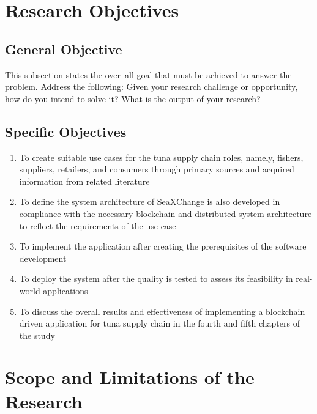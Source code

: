 \section{Research Objectives}
\label{sec:researchobjectives}

\subsection{General Objective}
\label{sec:generalobjective}

This subsection states the over--all goal that must be achieved to answer the problem.
Address the following: Given your research challenge or opportunity, how do you intend  to solve it? What is the output of your research?


\subsection{Specific Objectives}
\label{sec:specificobjectives}

%
%


\begin{enumerate}
	
	\item To create suitable use cases for the tuna supply chain roles, namely, fishers, suppliers, retailers, and consumers through primary sources and acquired information from related literature
	\item To define the system architecture of SeaXChange is also developed in compliance with the necessary blockchain and distributed system architecture to reflect the requirements of the use case
	\item To implement the application after creating the prerequisites of the software development  
	\item To deploy the system after the quality is tested to assess its feasibility in real-world applications 
	\item To discuss the overall results and effectiveness of implementing a blockchain driven application for tuna supply chain in the fourth and fifth chapters of the study
\end{enumerate}


\section{Scope and Limitations of the Research}
\label{sec:scopelimitations}

